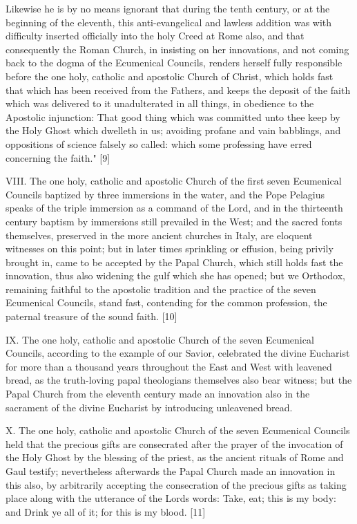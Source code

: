 Likewise he is by no means ignorant that during the tenth century, or at
the beginning of the eleventh, this anti-evangelical and lawless
addition was with difficulty inserted officially into the holy Creed at
Rome also, and that consequently the Roman Church, in insisting on her
innovations, and not coming back to the dogma of the Ecumenical
Councils, renders herself fully responsible before the one holy,
catholic and apostolic Church of Christ, which holds fast that which has
been received from the Fathers, and keeps the deposit of the faith which
was delivered to it unadulterated in all things, in obedience to the
Apostolic injunction: \textquotesingle That good thing which was
committed unto thee keep by the Holy Ghost which dwelleth in
us\textquotesingle; \textquotesingle avoiding profane and vain
babblings, and oppositions of science falsely so called: which some
professing have erred concerning the faith." {[}9{]}

VIII. The one holy, catholic and apostolic Church of the first seven
Ecumenical Councils baptized by three immersions in the water, and the
Pope Pelagius speaks of the triple immersion as a command of the Lord,
and in the thirteenth century baptism by immersions still prevailed in
the West; and the sacred fonts themselves, preserved in the more ancient
churches in Italy, are eloquent witnesses on this point; but in later
times sprinkling or effusion, being privily brought in, came to be
accepted by the Papal Church, which still holds fast the innovation,
thus also widening the gulf which she has opened; but we Orthodox,
remaining faithful to the apostolic tradition and the practice of the
seven Ecumenical Councils, \textquotesingle stand fast, contending for
the common profession, the paternal treasure of the sound
faith.\textquotesingle{} {[}10{]}

IX. The one holy, catholic and apostolic Church of the seven Ecumenical
Councils, according to the example of our Savior, celebrated the divine
Eucharist for more than a thousand years throughout the East and West
with leavened bread, as the truth-loving papal theologians themselves
also bear witness; but the Papal Church from the eleventh century made
an innovation also in the sacrament of the divine Eucharist by
introducing unleavened bread.

X. The one holy, catholic and apostolic Church of the seven Ecumenical
Councils held that the precious gifts are consecrated after the prayer
of the invocation of the Holy Ghost by the blessing of the priest, as
the ancient rituals of Rome and Gaul testify; nevertheless afterwards
the Papal Church made an innovation in this also, by arbitrarily
accepting the consecration of the precious gifts as taking place along
with the utterance of the Lord\textquotesingle s words:
\textquotesingle Take, eat; this is my body\textquotesingle: and
\textquotesingle Drink ye all of it; for this is my
blood.\textquotesingle{} {[}11{]}


